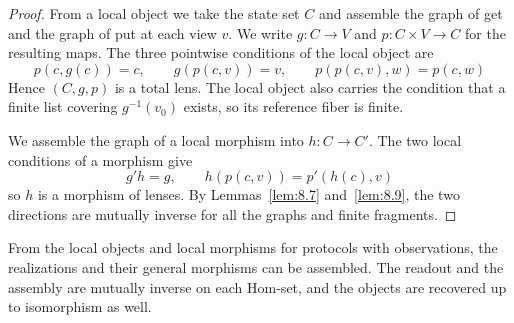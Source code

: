 \begin{proof}

From a local object we take the state set $C$ and assemble the graph of get and the graph of
put at each view $v$.
We write $g:C\to V$ and $p:C\times V\to C$ for the resulting maps.
The three pointwise conditions of the local object are
\begin{equation*}
p(c,g(c))=c,\qquad
g(p(c,v))=v,\qquad
p(p(c,v),w)=p(c,w)
\tag{8.21}\label{eq:8.21}
\end{equation*}
Hence $(C,g,p)$ is a total lens.
The local object also carries the condition that a finite list covering $g^{-1}(v_0)$ exists,
so its reference fiber is finite.

We assemble the graph of a local morphism into $h:C\to C'$.
The two local conditions of a morphism give
\begin{equation*}
g'h=g,\qquad
h(p(c,v))=p'(h(c),v)
\tag{8.22}\label{eq:8.22}
\end{equation*}
so $h$ is a morphism of lenses.
By Lemmas~\ref{lem:8.7} and~\ref{lem:8.9}, the two directions are mutually inverse for
all the graphs and finite fragments.

\end{proof}

\begin{lemma}\label{lem:8.24}

From the local objects and local morphisms for protocols with observations, the realizations
and their general morphisms can be assembled.
The readout and the assembly are mutually inverse on each Hom-set, and the objects are
recovered up to isomorphism as well.

\end{lemma}

